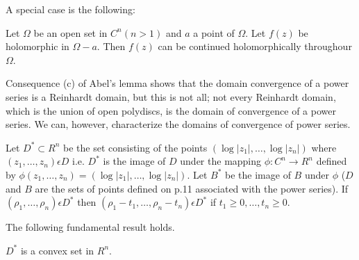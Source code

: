 A special case is the following:

Let $\Omega$ be an open set in $C^n(n>1)$ and $a$ a point of
$\Omega$. Let $f(z)$ be holomorphic in $\Omega -a$. Then $f(z)$ can be
continued holomorphically throughour $\Omega$.

Consequence (c) of Abel's lemma shows that the domain convergence of a
power series is a Reinhardt domain, but this is not\pageoriginale
all; not every Reinhardt domain, which is the union of open polydiscs, is the
domain of convergence of a power series. We can, however, characterize
the domains of convergence of power series.

Let $D^\ast \subset R^n$ be the set consisting of the points $(\log
|z_1|, \ldots, \log |z_n|)$ where $(z_1, \ldots, z_n) \epsilon D$
i.e. $D^\ast$ is the image of $D$ under the mapping $\phi : C^n \to
R^n$ defined by $\phi(z_1,\ldots, z_n) = (\log |z_1|, \ldots, \log
|z_n|)$. Let $B^\ast$ be  the image of $B$ under $\phi$ ($D$ and $B$
are the sets of points defined on p.11 associated with the power
series). If $(\rho_1, \ldots, \rho_n)\epsilon D^\ast$ then $(\rho_1 - t_1 ,
\ldots, \rho_n - t_n) \epsilon D^\ast$ if $t_1 \geq 0, \ldots, t_n \geq 0$.

The following fundamental result holds. 

\begin{thm}\label{chap2:thm2}
$D^\ast$ is a convex set in $R^n$.
\end{thm}

